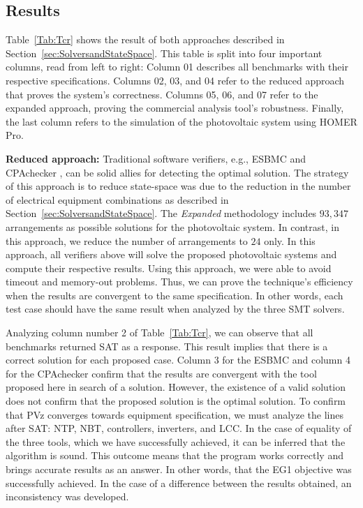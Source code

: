 \documentclass[review]{elsarticle}
\begin{document}
\subsection{Results}
\label{sec:results}

Table~\ref{Tab:Tcr} shows the result of both approaches described in Section~\ref{sec:SolversandStateSpace}. This table is split into four important columns, read from left to right: Column 01 describes all benchmarks with their respective specifications. Columns 02, 03, and 04 refer to the reduced approach that proves the system's correctness. Columns 05, 06, and 07 refer to the expanded approach, proving the commercial analysis tool's robustness. Finally, the last column refers to the simulation of the photovoltaic system using HOMER Pro.

\textbf{Reduced approach:} Traditional software verifiers, e.g., ESBMC \citep{esbmc2018} and CPAchecker \citep{Beyer2011}, can be solid allies for detecting the optimal solution. The strategy of this approach is to reduce state-space was due to the reduction in the number of electrical equipment combinations as described in Section~\ref{sec:SolversandStateSpace}. The \textit{Expanded} methodology includes $93,347$ arrangements as possible solutions for the photovoltaic system.
In contrast, in this approach, we reduce the number of arrangements to $24$ only. In this approach, all verifiers above will solve the proposed photovoltaic systems and compute their respective results. Using this approach, we were able to avoid timeout and memory-out problems. Thus, we can prove the technique's efficiency when the results are convergent to the same specification. In other words, each test case should have the same result when analyzed by the three SMT solvers.

Analyzing column number 2 of Table~\ref{Tab:Tcr}, we can observe that all benchmarks returned SAT as a response. This result implies that there is a correct solution for each proposed case. Column 3 for the ESBMC and column 4 for the CPAchecker confirm that the results are convergent with the tool proposed here in search of a solution. However, the existence of a valid solution does not confirm that the proposed solution is the optimal solution. To confirm that PVz converges towards equipment specification, we must analyze the lines after SAT: NTP, NBT, controllers, inverters, and LCC. In the case of equality of the three tools, which we have successfully achieved, it can be inferred that the algorithm is sound. This outcome means that the program works correctly and brings accurate results as an answer. In other words, that the EG1 objective was successfully achieved. In the case of a difference between the results obtained, an inconsistency was developed.
\end{document}
